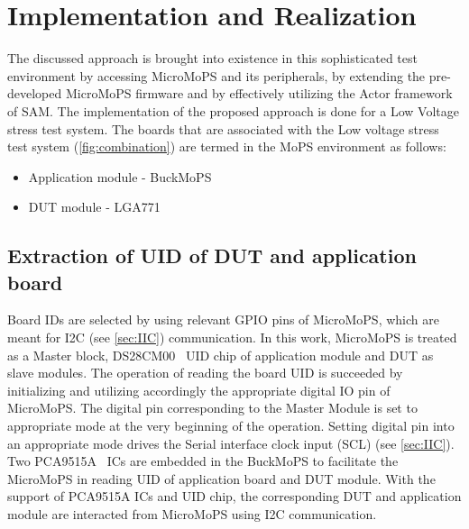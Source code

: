 \chapter{Implementation and Realization}
The discussed approach is brought into existence in this sophisticated test environment by accessing MicroMoPS and its peripherals, by extending the pre-developed MicroMoPS firmware and by effectively utilizing the Actor framework of SAM. 
The implementation of the proposed approach is done for a Low Voltage stress test system. 
The boards that are associated with the Low voltage stress test system (\cref{fig:combination}) are termed in the MoPS environment as follows:
\begin{itemize}
	\item Application module - BuckMoPS
	\item DUT module - LGA771
\end{itemize}


\section{Extraction of UID of DUT and application board}\label{comm}
Board IDs are selected by using relevant \gls{GPIO} pins of MicroMoPS, which are meant for I2C (see \cref{sec:IIC}) communication.
In this work, MicroMoPS is treated as a Master block, DS28CM00~\cite{Maxim-DS28CM00-2006a} UID chip of application module and DUT as slave modules.
The operation of reading the board UID is succeeded by initializing and utilizing accordingly the appropriate digital IO pin of MicroMoPS.
The digital pin corresponding to the Master Module is set to appropriate mode at the very beginning of the operation.
Setting digital pin into an appropriate mode drives the Serial interface clock input (SCL) (see \cref{sec:IIC}).
Two PCA9515A~\cite{PCA951A-2014} ICs are embedded in the BuckMoPS to facilitate the MicroMoPS in reading UID of application board and \acrshort{DUT} module. 
With the support of PCA9515A ICs and UID chip, the corresponding DUT and application module are interacted from MicroMoPS using I2C communication. 

